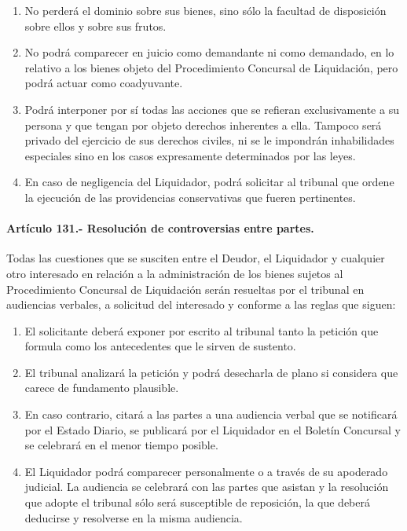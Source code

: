 \documentclass[
]{book}
\begin{document}
\begin{enumerate}
\def\labelenumi{\arabic{enumi})}
\setcounter{enumi}{1}
\item
  No perderá el dominio sobre sus bienes, sino sólo la facultad de disposición sobre ellos y sobre sus frutos.
\item
  No podrá comparecer en juicio como demandante ni como demandado, en lo relativo a los bienes objeto del Procedimiento Concursal de Liquidación, pero podrá actuar como coadyuvante.
\item
  Podrá interponer por sí todas las acciones que se refieran exclusivamente a su persona y que tengan por objeto derechos inherentes a ella. Tampoco será privado del ejercicio de sus derechos civiles, ni se le impondrán inhabilidades especiales sino en los casos expresamente determinados por las leyes.
\item
  En caso de negligencia del Liquidador, podrá solicitar al tribunal que ordene la ejecución de las providencias conservativas que fueren pertinentes.
\end{enumerate}

\hypertarget{artuxedculo-131.--resoluciuxf3n-de-controversias-entre-partes.}{%
\paragraph*{Artículo 131.- Resolución de controversias entre partes.}\label{artuxedculo-131.--resoluciuxf3n-de-controversias-entre-partes.}}

Todas las cuestiones que se susciten entre el Deudor, el Liquidador y cualquier otro interesado en relación a la administración de los bienes sujetos al Procedimiento Concursal de Liquidación serán resueltas por el tribunal en audiencias verbales, a solicitud del interesado y conforme a las reglas que siguen:

\begin{enumerate}
\def\labelenumi{\alph{enumi})}
\item
  El solicitante deberá exponer por escrito al tribunal tanto la petición que formula como los antecedentes que le sirven de sustento.
\item
  El tribunal analizará la petición y podrá desecharla de plano si considera que carece de fundamento plausible.
\item
  En caso contrario, citará a las partes a una audiencia verbal que se notificará por el Estado Diario, se publicará por el Liquidador en el Boletín Concursal y se celebrará en el menor tiempo posible.
\item
  El Liquidador podrá comparecer personalmente o a través de su apoderado judicial. La audiencia se celebrará con las partes que asistan y la resolución que adopte el tribunal sólo será susceptible de reposición, la que deberá deducirse y resolverse en la misma audiencia.
\end{enumerate}
\end{document}
